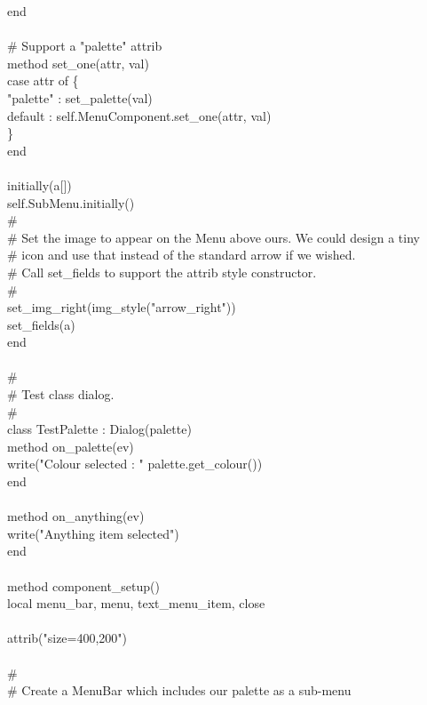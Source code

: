 {\>end \\
\ \\
\>\# Support a "palette" attrib \\
\>method set\_one(attr, val) \\
\>\>case attr of \{ \\
\>\>\>"palette" : set\_palette(val) \\
\>\>\>default : self.MenuComponent.set\_one(attr, val) \\
\>\>\>\} \\
\>end \\
\ \\
\>initially(a[]) \\
\>\>self.SubMenu.initially() \\
\>\>\# \\
\>\>\# Set the image to appear on the Menu above ours. We could design a tiny \\
\>\>\# icon and use that instead of the standard arrow if we wished. \\
\>\>\# Call set\_fields to support the attrib style constructor. \\
\>\>\#  \\
\>\>set\_img\_right(img\_style("arrow\_right")) \\
\>\>set\_fields(a) \\
end \\
\ \\
\# \\
\# Test class dialog. \\
\# \\
class TestPalette : Dialog(palette) \\
\>method on\_palette(ev) \\
\>\>write("Colour selected : " {\textbar}{\textbar} palette.get\_colour()) \\
\>end \\
\ \\
\>method on\_anything(ev) \\
\>\>write("Anything item selected") \\
\>end \\
\ \\
\>method component\_setup() \\
\>\>local menu\_bar, menu, text\_menu\_item, close \\
\\
\>\>attrib("size=400,200") \\
\ \\
\>\>\# \\
\>\>\# Create a MenuBar which includes our palette as a sub-menu \\
}
